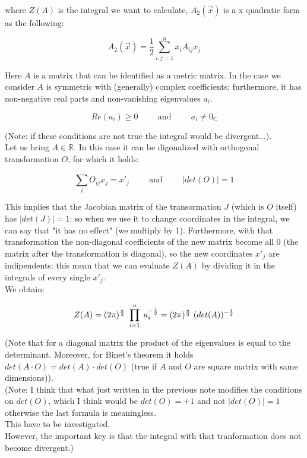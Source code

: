 \documentclass[12pt, english, a4paper]{book}
\begin{document}
where $Z(A)$ is the integral we want to calculate, $A_2(\vec{x})$ is a x quadratic form as the following:

\begin{equation}
A_2(\vec{x}) = \frac{1}{2} \sum\limits_{i,j = 1}^{n} x_i A_{ij} x_j
\end{equation}

Here $A$ is a matrix that can be identified as a metric matrix.
In the case we consider $A$ is symmetric with (generally) complex coefficients; furthermore, it has non-negative real parts and non-vanishing eigenvalues $a_i$.

$$ Re(a_i) \geq 0 \hspace{1cm} \mathrm{and} \hspace{1cm}  a_i \neq 0_{\mathbb{C}} $$

(Note: if these conditions are not true the integral would be divergent...).\\

Let us bring $A \in \mathbb{R}$. In this case it can be digonalized with orthogonal transformation $O$, for which it holds:

$$ \sum\limits_{i}^{} O_{ij} x_j = x'_j \hspace{1cm} \mathrm{and} \hspace{1cm} |det(O)| = 1 $$

This implies that the Jacobian matrix of the transormation $J$ (which is $O$ itself) has $|det(J)| = 1$: so when we use it to change coordinates in the integral, we can say that "it has no effect" (we multiply by 1).
Furthermore, with that transformation the non-diagonal coefficients of the new matrix become all 0 (the matrix after the transformation is diagonal), so the new coordinates $x'_j$ are indipendents: this mean that we can evaluate $Z(A)$ by dividing it in the integrals of every single $x'_j$.\\
We obtain:

\begin{equation}\label{Gaussian integral result}
Z(A) = (2\pi)^{ \frac{n}{2} } \hspace{1mm} \prod\limits_{i=1}^{n} \hspace{1mm} a_i^{ -\frac{1}{2} } = (2\pi)^{ \frac{n}{2} } \hspace{1mm} (det(A))^{ -\frac{1}{2} }
\end{equation}

(Note that for a diagonal matrix the product of the eigenvalues is equal to the determinant. Moreover, for Binet's theorem it holds $det(A \cdot O) = det(A) \cdot det(O)$ (true if $A$ and $O$ are square matrix with same dimensions)).\\
(Note: I think that what just written in the previous note modifies the conditions on $det(O)$, which I think would be $det(O) = +1$ and not $|det(O)| = 1 $ otherwise the last formula is meaningless.\\
This have to be investigated.\\
However, the important key is that the integral with that tranformation does not become divergent.)\\
\end{document}
